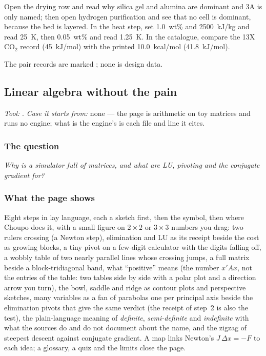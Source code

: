 \documentclass[11pt,a4paper]{article}
\begin{document}
\begin{tryit}
Open the drying row and read why silica gel and alumina are dominant and 3A is
only named; then open hydrogen purification and see that no cell is dominant,
because the bed is layered.  In the heat step, set 1.0~wt\% and 2500~kJ/kg and
read 25~K, then 0.05~wt\% and read 1.25~K.  In the catalogue, compare the 13X
CO$_2$ record (45~kJ/mol) with the printed 10.0~kcal/mol (41.8~kJ/mol).
\end{tryit}

The pair records are marked ; none is design data.

\subsection{Linear algebra without the pain}\label{sec:edu-linear-algebra-without-pain}


\noindent\textit{\small Tool:} .
\textit{\small Case it starts from:} none --- the page is arithmetic on toy
matrices and runs no engine; what is the engine's is each file and line it
cites.

\subsubsection*{The question}

\emph{Why is a simulator full of matrices, and what are LU, pivoting and the
conjugate gradient for?}

\subsubsection*{What the page shows}

Eight steps in lay language, each a sketch first, then the symbol, then where
Choupo does it, with a small figure on $2\times2$ or $3\times3$ numbers you
drag: two rulers crossing (a Newton step), elimination and LU as its receipt
beside the cost as growing blocks, a tiny pivot on a few-digit calculator with
the digits falling off, a wobbly table of two nearly parallel lines whose
crossing jumps, a full matrix beside a block-tridiagonal band, what ``positive''
means (the number $x'Ax$, not the entries of the table: two tables side by side
with a polar plot and a direction arrow you turn), the bowl, saddle and ridge as
contour plots and perspective sketches, many variables as a fan of parabolas one
per principal axis beside the elimination pivots that give the same verdict
(the receipt of step~2 is also the test), the plain-language meaning of
\emph{definite}, \emph{semi-definite} and \emph{indefinite} with what the
sources do and do not document about the name, and the zigzag of steepest
descent against conjugate gradient.  A map links Newton's $J\,\Delta x=-F$ to
each idea; a glossary, a quiz and the limits close the page.
\end{document}
